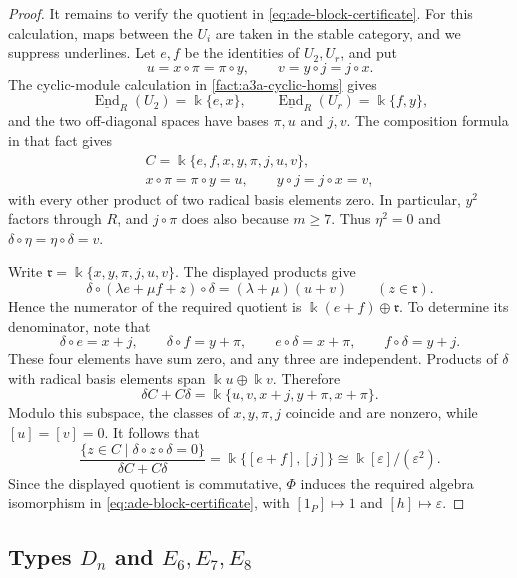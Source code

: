 \documentclass[a4paper,11pt,reqno]{amsart}
\theoremstyle{definition}
\theoremstyle{plain}
\numberwithin{equation}{section}
\newcommand{\End}{\operatorname{End}}
\newcommand{\kk}{\Bbbk}
\begin{document}
\begin{proof}
It remains to verify the quotient in \eqref{eq:ade-block-certificate}.
For this calculation, maps between the \(U_i\) are taken in the
stable category, and we suppress underlines.
Let \(e,f\) be the identities of \(U_2,U_r\), and put
\[
 u=x\circ \pi=\pi\circ y,
 \qquad
 v=y\circ j=j\circ x.
\]
The cyclic-module calculation in \cref{fact:a3a-cyclic-homs} gives
\[
 \underline{\End}_R(U_2)=\kk\{e,x\},
 \qquad \underline{\End}_R(U_r)=\kk\{f,y\},
\]
and the two off-diagonal spaces have bases \(\pi,u\) and \(j,v\).
The composition formula in that fact gives
\begin{equation}
\label{eq:an-small-algebra}
\begin{gathered}
 C=\kk\{e,f,x,y,\pi,j,u,v\},\\
 x\circ \pi=\pi\circ y=u,
 \qquad y\circ j=j\circ x=v,
\end{gathered}
\end{equation}
with every other product of two radical basis elements zero.  In
particular, \(y^2\) factors through \(R\), and
\(j\circ \pi\) does also because \(m\ge7\).
Thus \(\eta^2=0\) and \(\delta\circ\eta=\eta\circ\delta=v\).

Write \(\mathfrak r=\kk\{x,y,\pi,j,u,v\}\).  The displayed products
give
\[
 \delta\circ(\lambda e+\mu f+z)\circ\delta
   =(\lambda+\mu)(u+v)
 \qquad(z\in\mathfrak r).
\]
Hence the numerator of the required quotient is
\(\kk(e+f)\oplus\mathfrak r\).  To determine its denominator, note
that
\[
 \delta\circ e=x+j,\qquad
 \delta\circ f=y+\pi,\qquad
 e\circ\delta=x+\pi,\qquad
 f\circ\delta=y+j.
\]
These four elements have sum zero, and any three are independent.
Products of \(\delta\) with radical basis elements span
\(\kk u\oplus\kk v\).  Therefore
\begin{equation}
\label{eq:an-quotient-certificate}
 \delta C+C\delta
 =\kk\{u,v,x+j,y+\pi,x+\pi\}.
\end{equation}
Modulo this subspace, the classes of \(x,y,\pi,j\) coincide and are
nonzero, while \([u]=[v]=0\).  It follows that
\[
 \frac{\{z\in C\mid\delta\circ z\circ\delta=0\}}
      {\delta C+C\delta}
 =\kk\{[e+f],[j]\}
 \cong\kk[\varepsilon]/(\varepsilon^2).
\]
Since the displayed quotient is commutative, \(\Phi\) induces the
required algebra isomorphism in \eqref{eq:ade-block-certificate}, with
\([1_P]\mapsto1\) and \([h]\mapsto\varepsilon\).
\end{proof}
\subsection{Types \texorpdfstring{$D_n$ and $E_6,E_7,E_8$}{Dn and E6, E7, E8}}
\end{document}
